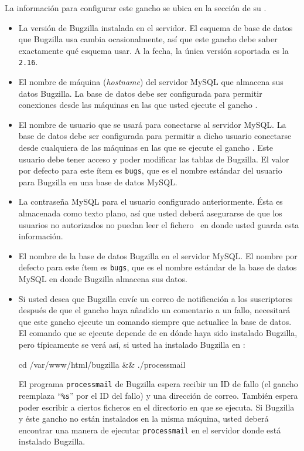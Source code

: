 La información para configurar este gancho se ubica en la sección 
 de su \hgrc.
\begin{itemize}
\item[\rcitem{bugzilla}{version}] La versión de Bugzilla instalada en
  el servidor. El esquema de base de datos que Bugzilla usa cambia
  ocasionalmente, así que este gancho debe saber exactamente qué
  esquema usar. A la fecha, la única versión soportada es la
  \texttt{2.16}.
\item[\rcitem{bugzilla}{host}] El nombre de máquina (\emph{hostname})
  del servidor MySQL que almacena sus datos Bugzilla. La base de datos
  debe ser configurada para permitir conexiones desde las máquinas en
  las que usted ejecute el gancho .
\item[\rcitem{bugzilla}{user}] El nombre de usuario que se usará para
  conectarse al servidor MySQL. La base de datos debe ser configurada
  para permitir a dicho usuario conectarse desde cualquiera de las
  máquinas en las que se ejecute el gancho .  Este
  usuario debe tener acceso y poder modificar las tablas de Bugzilla.
  El valor por defecto para este ítem es \texttt{bugs}, que es el
  nombre estándar del usuario para Bugzilla en una base de datos
  MySQL.
\item[\rcitem{bugzilla}{password}] La contraseña MySQL para el usuario
  configurado anteriormente. Ésta es almacenada como texto plano, así
  que usted deberá asegurarse de que los usuarios no autorizados no
  puedan leer el fichero \hgrc\ en donde usted guarda esta
  información.
\item[\rcitem{bugzilla}{db}] El nombre de la base de datos Bugzilla en
  el servidor MySQL. El nombre por defecto para este ítem es
  \texttt{bugs}, que es el nombre estándar de la base de datos MySQL
  en donde Bugzilla almacena sus datos.
\item[\rcitem{bugzilla}{notify}] Si usted desea que Bugzilla envíe un
  correo de notificación a los suscriptores después de que el gancho
  haya añadido un comentario a un fallo, necesitará que este gancho
  ejecute un comando siempre que actualice la base de datos. El
  comando que se ejecute depende de en dónde haya sido instalado
  Bugzilla, pero típicamente se verá así, si usted ha instalado
  Bugzilla en :
  \begin{codesample4}
    cd /var/www/html/bugzilla && ./processmail %
  \end{codesample4}
  El programa \texttt{processmail} de Bugzilla espera recibir un ID de
  fallo (el gancho reemplaza ``\texttt{\%s}'' por el ID del fallo) y
  una dirección de correo. También espera poder escribir a ciertos
  ficheros en el directorio en que se ejecuta. Si Bugzilla y éste
  gancho no están instalados en la misma máquina, usted deberá
  encontrar una manera de ejecutar \texttt{processmail} en el servidor
  donde está instalado Bugzilla.
\end{itemize}

